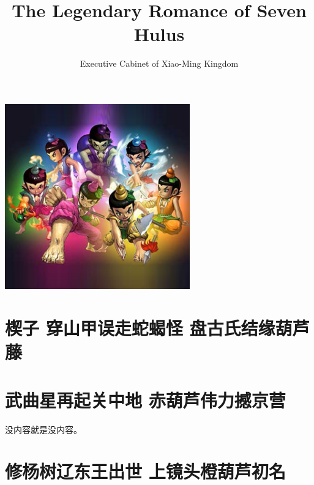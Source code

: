 \documentclass[12pt, a4paper]{book}
\title{\textbf{The Legendary Romance of Seven Hulus}}
\author{Executive Cabinet of Xiao-Ming Kingdom}
\begin{document}
\begin{CJK}{UTF8}{gbsn}

    \maketitle
    \clearpage
    \thispagestyle{empty}

    \frontmatter
    
    \vspace*{50 mm}
    \begin{center}
    \includegraphics[width=0.6\textwidth]{figure/hulu.png}
    \end{center}

    
    

    \chapter{楔子  穿山甲误走蛇蝎怪 盘古氏结缘葫芦藤}

    \tableofcontents

    \mainmatter


    \chapter{武曲星再起关中地 赤葫芦伟力撼京营}
    
    没内容就是没内容。

    \chapter{修杨树辽东王出世 上镜头橙葫芦初名}
    

\end{CJK}
\end{document}
